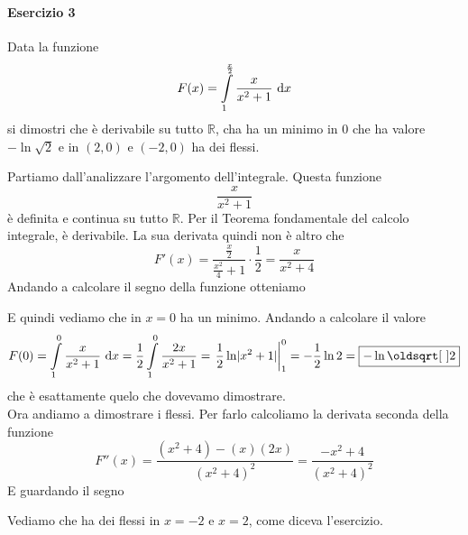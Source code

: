 \paragraph{Esercizio 3}
Data la funzione
\begin{equation*}
  F(x)=\int\limits_{1}^{\frac{x}{2}} \frac{x}{x^2+1}\,\mathop{}\!\mathrm{d} x
\end{equation*}
si dimostri che è derivabile su tutto $\mathbb{R}$, cha ha un minimo in $0$ che ha valore 
$-\ln\sqrt{2}$ e in $(2,0)$ e $(-2,0)$ ha dei flessi.
\divisor

Partiamo dall'analizzare l'argomento dell'integrale. Questa funzione
\begin{equation*}
  \frac{x}{x^2+1}
\end{equation*}
è definita e continua su tutto $\mathbb{R}$. Per il Teorema fondamentale del calcolo integrale,
è derivabile. La sua derivata quindi non è altro che
\begin{equation*}
  F'(x)=\frac{\frac{x}{2}}{\frac{x^2}{4}+1}\cdot\frac{1}{2} = \frac{x}{x^2+4}
\end{equation*}
Andando a calcolare il segno della funzione otteniamo
\begin{center}
  \end{center}
  E quindi vediamo che in $x=0$ ha un minimo. Andando a calcolare il valore
  \begin{equation*}
    F(0) = \int\limits_{1}^{0} \frac{x}{x^2+1}\,\dif x=
    \frac{1}{2}\int\limits_{1}^{0} \frac{2x}{x^2+1}=\left.\frac{1}{2}\ln\abs{x^2+1}\right|_1^0=
      -\frac{1}{2}\ln2=\boxed{-\ln\sqrt{2}}
    \end{equation*}
    che è esattamente quelo che dovevamo dimostrare.\\
    Ora andiamo a dimostrare i flessi. Per farlo calcoliamo la derivata seconda della funzione
    \begin{equation*}
      F''(x)=\frac{(x^2+4)-(x)(2x)}{(x^2+4)^2}=\frac{-x^2+4}{(x^2+4)^2}
    \end{equation*}
    E guardando il segno
    \begin{center}
      \end{center}
      Vediamo che ha dei flessi in $x=-2$ e $x=2$, come diceva l'esercizio.
